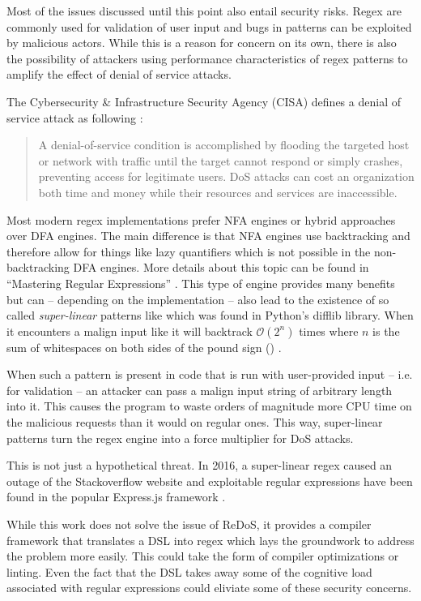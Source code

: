 Most of the issues discussed until this point also entail security risks. Regex are commonly used for validation of user input and bugs in patterns can be exploited by malicious actors. While this is a reason for concern on its own, there is also the possibility of attackers using performance characteristics of regex patterns to amplify the effect of denial of service attacks.

The Cybersecurity \& Infrastructure Security Agency (CISA) defines a denial of service attack as following \cite{DenialOfService}:

{\small
\begin{quote}
A denial-of-service condition is accomplished by flooding the targeted host or network with traffic until the target cannot respond or simply crashes, preventing access for legitimate users. DoS attacks can cost an organization both time and money while their resources and services are inaccessible.
\end{quote}
}

Most modern regex implementations prefer NFA engines or hybrid approaches over DFA engines. The main difference is that NFA engines use backtracking and therefore allow for things like lazy quantifiers which is not possible in the non-backtracking DFA engines. More details about this topic can be found in \enquote{Mastering Regular Expressions} \cite{MasteringRegex}. This type of engine provides many benefits but can -- depending on the implementation -- also lead to the existence of so called \emph{super-linear} patterns like  which was found in Python's difflib library. When it encounters a malign input like  it will backtrack $\mathcal{O}(2^n)$ times where $n$ is the sum of whitespaces on both sides of the pound sign () \cite{RedosInPractice}.

When such a pattern is present in code that is run with user-provided input -- i.e. for validation -- an attacker can pass a malign input string of arbitrary length into it. This causes the program to waste orders of magnitude more CPU time on the malicious requests than it would on regular ones. This way, super-linear patterns turn the regex engine into a force multiplier for DoS attacks.

This is not just a hypothetical threat. In 2016, a super-linear regex caused an outage of the Stackoverflow website \cite{RedosStackOverflowOutage} and exploitable regular expressions have been found in the popular Express.js framework \cite{RedosExpressJs}.

While this work does not solve the issue of ReDoS, it provides a compiler framework that translates a DSL into regex which lays the groundwork to address the problem more easily. This could take the form of compiler optimizations or linting. Even the fact that the DSL takes away some of the cognitive load associated with regular expressions could eliviate some of these security concerns.

